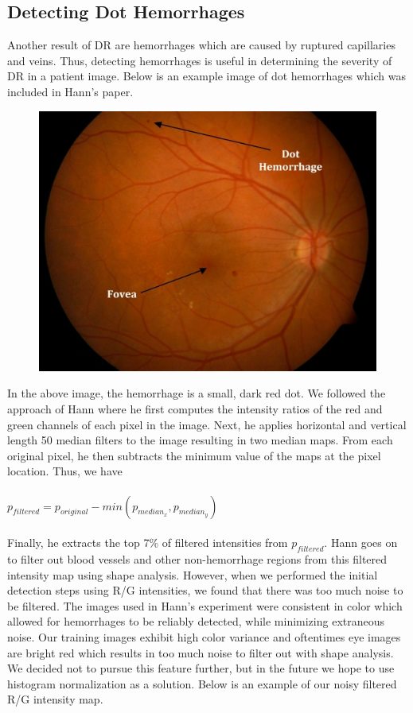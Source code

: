 \documentclass{article} %
\begin{document}
\subsection{Detecting Dot Hemorrhages}
Another result of DR are hemorrhages which are caused by ruptured capillaries and veins. Thus, detecting hemorrhages is useful in determining the severity of DR in a patient image. Below is an example image of dot hemorrhages which was included in Hann's paper.
\begin{figure}[H]
	\centerline{\includegraphics[scale=0.3]{./images/dh.jpg}}
\end{figure}
In the above image, the hemorrhage is a small, dark red dot. We followed the approach of Hann where he first computes the intensity ratios of the red and green channels of each pixel in the image. Next, he applies horizontal and vertical length 50 median filters to the image resulting in two median maps. From each original pixel, he then subtracts the minimum value of the maps at the pixel location. Thus, we have \\ \\
$p_{filtered} = p_{original} - min(p_{median_x},p_{median_y})$ \\ \\
Finally, he extracts the top 7\% of filtered intensities from $p_{filtered}$. Hann goes on to filter out blood vessels and other non-hemorrhage regions from this filtered intensity map using shape analysis. However, when we performed the initial detection steps using R/G intensities, we found that there was too much noise to be filtered. The images used in Hann's experiment were consistent in color which allowed for hemorrhages to be reliably detected, while minimizing extraneous noise. Our training images exhibit high color variance and oftentimes eye images are bright red which results in too much noise to filter out with shape analysis. We decided not to pursue this feature further, but in the future we hope to use histogram normalization as a solution. Below is an example of our noisy filtered R/G intensity map.
\end{document}
